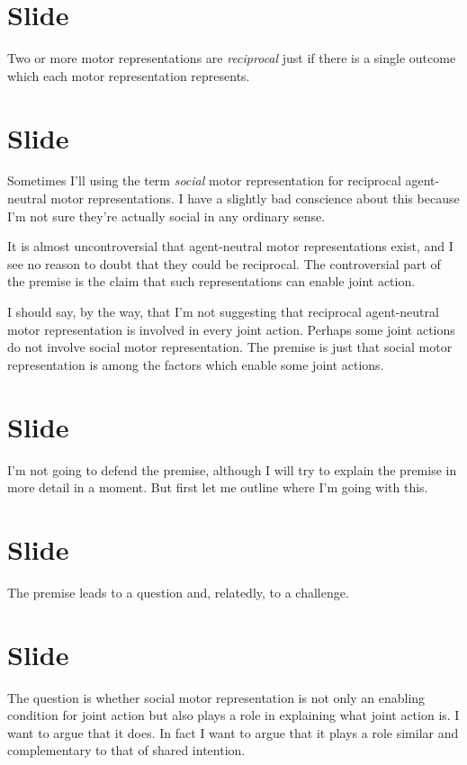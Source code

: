 \documentclass[12pt,\papersize]{extarticle}
\begin{document}
\section{Slide}
Two or more motor representations are \emph{reciprocal} just if there is a single outcome which each motor representation represents.


\section{Slide}
Sometimes I’ll using the term \emph{social} motor representation for reciprocal agent-neutral motor representations.
I have a slightly bad conscience about this because I’m not sure they’re actually social in any ordinary sense.

It is almost uncontroversial that agent-neutral motor representations exist, and I see no reason to doubt that they could be reciprocal.
The controversial part of the premise is the claim that such representations can enable joint action.

I should say, by the way, that I’m not suggesting that reciprocal agent-neutral motor representation is involved in every joint action.
Perhaps some joint actions do not involve social motor representation.
The premise is just that social motor representation is among the factors which enable some joint actions.



\section{Slide}
I’m not going to defend the premise, although I will try to explain the premise in more detail in a moment.  But first let me outline where I’m going with this.



\section{Slide}
The premise leads to a question and, relatedly, to a challenge.  



\section{Slide}
The question is whether social motor representation is not only an enabling condition for joint action but also plays a role in explaining what joint action is. I want to argue that it does.  In fact I want to argue that it plays a role similar and complementary to that of shared intention.
\end{document}
